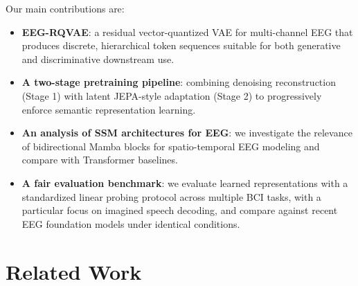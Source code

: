 \documentclass{article}
\begin{document}
Our main contributions are:
\begin{itemize}
  \item \textbf{EEG-RQVAE}: a residual vector-quantized VAE for multi-channel EEG that produces discrete, hierarchical token sequences suitable for both generative and discriminative downstream use.
  \item \textbf{A two-stage pretraining pipeline}: combining denoising reconstruction (Stage 1) with latent JEPA-style adaptation (Stage 2) to progressively enforce semantic representation learning.
  \item \textbf{An analysis of SSM architectures for EEG}: we investigate the relevance of bidirectional Mamba blocks for spatio-temporal EEG modeling and compare with Transformer baselines.
  \item \textbf{A fair evaluation benchmark}: we evaluate learned representations with a standardized linear probing protocol across multiple BCI tasks, with a particular focus on imagined speech decoding, and compare against recent EEG foundation models under identical conditions.
\end{itemize}


\section{Related Work}
\end{document}
